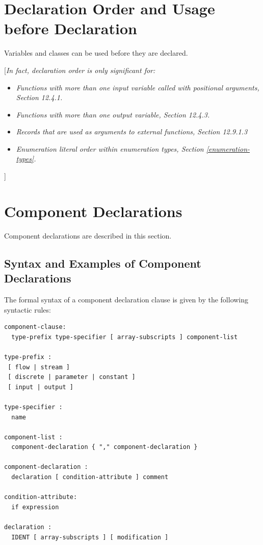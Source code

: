 \documentclass[10pt,a4paper]{report}
\def\Mcommentbegin#1{{[}\emph{#1}}
\def\Mcommentend#1{\emph{#1}{]}}
\def\Mcommentmid#1{\emph{#1}}
\def\doublelabel#1{\label{#1}\hypertarget{#1}{}}
\begin{document}
\section{Declaration Order and Usage before Declaration}\doublelabel{declaration-order-and-usage-before-declaration}

Variables and classes can be used before they are declared.

\Mcommentbegin{In fact, declaration order is only significant for:}

\begin{itemize}
\item
  \Mcommentmid{Functions with more than one input variable called with
  positional arguments, Section 12.4.1.}
\item
  \Mcommentmid{Functions with more than one output variable, Section 12.4.3.}
\item
  \Mcommentmid{Records that are used as arguments to external functions,
  Section 12.9.1.3}
\item
  \Mcommentmid{Enumeration literal order within enumeration types, Section \ref{enumeration-types}.}
\end{itemize}

\Mcommentend{}

\section{Component Declarations}\doublelabel{component-declarations}

Component declarations are described in this section.

\subsection{Syntax and Examples of Component Declarations}\doublelabel{syntax-and-examples-of-component-declarations}

The formal syntax of a component declaration clause is given by the
following syntactic rules:
\begin{lstlisting}[language=grammar]
component-clause: 
  type-prefix type-specifier [ array-subscripts ] component-list

type-prefix :
 [ flow | stream ]
 [ discrete | parameter | constant ] 
 [ input | output ]
 
type-specifier : 
  name

component-list : 
  component-declaration { "," component-declaration }

component-declaration : 
  declaration [ condition-attribute ] comment

condition-attribute: 
  if expression

declaration : 
  IDENT [ array-subscripts ] [ modification ]
\end{lstlisting}
\end{document}
